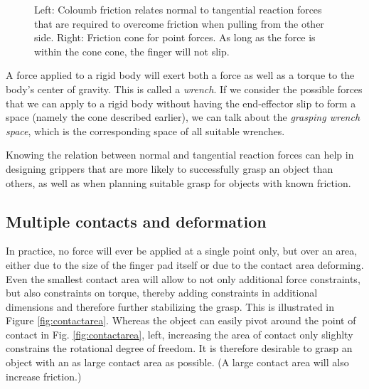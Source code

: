 \begin{figure}
\caption{Left: Coloumb friction relates normal to tangential reaction forces that are required to overcome friction when pulling from the other side. Right: Friction cone for point forces. As long as the force is within the cone cone, the finger will not slip.} 
\end{figure}

A force applied to a rigid body will exert both a force as well as a torque to the body's center of gravity. This is called a \emph{wrench}. If we consider the possible forces that we can apply to a rigid body without having the end-effector slip to form a space (namely the cone described earlier), we can talk about the \emph{grasping wrench space}, which is the corresponding space of all suitable wrenches.

Knowing the relation between normal and tangential reaction forces can help in designing grippers that are more likely to successfully grasp an object than others, as well as when planning suitable grasp for objects with known friction. 


\subsection{Multiple contacts and deformation}
In practice, no force will ever be applied at a single point only, but over an area, either due to the size of the finger pad itself or due to the contact area deforming. Even the smallest contact area will allow to not only additional force constraints, but also constraints on torque, thereby adding constraints in additional dimensions and therefore further stabilizing the grasp. This is illustrated in Figure \ref{fig:contactarea}. Whereas the object can easily pivot around the point of contact in Fig. \ref{fig:contactarea}, left, increasing the area of contact only slighlty constrains the rotational degree of freedom. It is therefore desirable to grasp an object with an as large contact area as possible. (A large contact area will also increase friction.)

